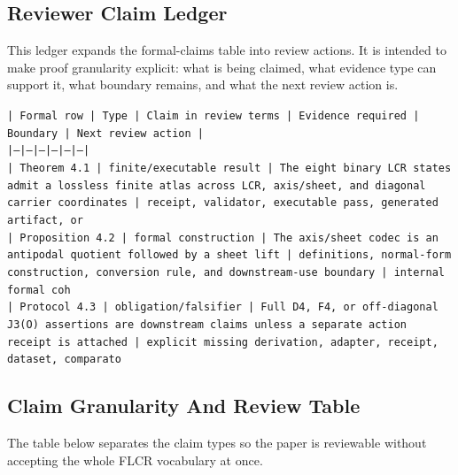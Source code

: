 \documentclass[11pt]{article}
\begin{document}
\subsection*{Reviewer Claim Ledger}

This ledger expands the formal-claims table into review actions. It is intended to make proof granularity explicit: what is being claimed, what evidence type can support it, what boundary remains, and what the next review action is.

\noindent\texttt{| Formal row | Type | Claim in review terms | Evidence required | Boundary | Next review action |}\\
\noindent\texttt{|---|---|---|---|---|---|}\\
\noindent\texttt{| Theorem 4.1 | finite/executable result | The eight binary LCR states admit a lossless finite atlas across LCR, axis/sheet, and diagonal carrier coordinates | receipt, validator, executable pass, generated artifact, or }\\
\noindent\texttt{| Proposition 4.2 | formal construction | The axis/sheet codec is an antipodal quotient followed by a sheet lift | definitions, normal-form construction, conversion rule, and downstream-use boundary | internal formal coh}\\
\noindent\texttt{| Protocol 4.3 | obligation/falsifier | Full D4, F4, or off-diagonal J3(O) assertions are downstream claims unless a separate action receipt is attached | explicit missing derivation, adapter, receipt, dataset, comparato}\\

\subsection*{Claim Granularity And Review Table}

The table below separates the claim types so the paper is reviewable without accepting the whole FLCR vocabulary at once.
\end{document}
